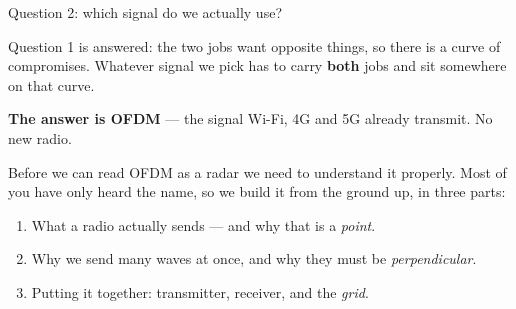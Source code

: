 \begin{frame}{Question 2: which signal do we actually use?}
  \vspace{0.3em}
  {\small Question 1 is answered: the two jobs want opposite things, so there is a
   curve of compromises. Whatever signal we pick has to carry \textbf{both} jobs and
   sit somewhere on that curve.\par}

  \vspace{0.45em}
  {\large\textbf{The answer is OFDM}  --- the signal Wi-Fi, 4G and 5G already transmit. No new radio.\par}

  \vspace{0.45em}
  {\small Before we can read OFDM as a radar we need to understand it properly. Most
   of you have only heard the name, so we build it from the ground up, in three parts:\par}
  \vspace{0.2em}
  {\small
  \begin{enumerate}\itemsep0pt
    \item What a radio actually sends --- and why that is a \emph{point}.
    \item Why we send many waves at once, and why they must be \emph{perpendicular}.
    \item Putting it together: transmitter, receiver, and the \emph{grid}.
  \end{enumerate}}

\end{frame}

